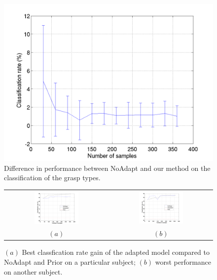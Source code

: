 \begin{figure}[t]
  \centering
  \includegraphics[width=0.95\linewidth]{figs/exp1}
  \caption{Difference in performance between NoAdapt and our method  on the
 classification of the grasp types.}
  \label{fig:diff_cla}
\end{figure}

\begin{figure}[ht] \centering
  \begin{tabular}{cc}
    \includegraphics[width=0.45\textwidth]{figs/exp1_abs_best} &
    \includegraphics[width=0.45\textwidth]{figs/exp1_abs_worst} \\
    $(a)$ & $(b)$ \\
  \end{tabular}
  \caption{$(a)$ Best classfication rate gain of the adapted model compared to
 NoAdapt and Prior on a particular subject; $(b)$ worst performance on another subject.}
  \label{fig:cla_abs}
\end{figure}

